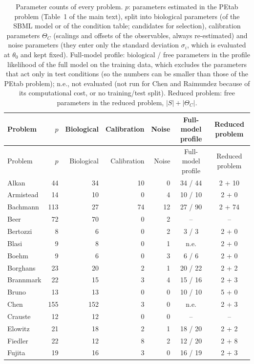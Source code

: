 \begin{longtable}{@{}lrrrrcc@{}}
\caption{Parameter counts of every problem. $p$: parameters estimated in the PEtab problem (Table~1 of the main text), split into biological parameters (of the SBML model or of the condition table; candidates for selection), calibration parameters $\Theta_C$ (scalings and offsets of the observables, always re-estimated) and noise parameters (they enter only the standard deviation $\sigma_i$, which is evaluated at $\theta_0$ and kept fixed). Full-model profile: biological / free parameters in the profile likelihood of the full model on the training data, which excludes the parameters that act only in test conditions (so the numbers can be smaller than those of the PEtab problem); n.e., not evaluated (not run for Chen and Raimundez because of its computational cost, or no training/test split). Reduced problem: free parameters in the reduced problem, $|S|+|\Theta_C|$.}\label{tab:counts}\\
\toprule
Problem & $p$ & Biological & Calibration & Noise & Full-model profile & Reduced problem \\
\midrule
\endfirsthead
\toprule
Problem & $p$ & Biological & Calibration & Noise & Full-model profile & Reduced problem \\
\midrule
\endhead
Alkan & 44 & 34 & 10 & 0 & 34 / 44 & 2 + 10 \\
Armistead & 14 & 10 & 0 & 4 & 10 / 10 & 2 + 0 \\
Bachmann & 113 & 27 & 74 & 12 & 27 / 90 & 2 + 74 \\
Beer & 72 & 70 & 0 & 2 & -- & -- \\
Bertozzi & 8 & 6 & 0 & 2 & 3 / 3 & 2 + 0 \\
Blasi & 9 & 8 & 0 & 1 & n.e. & 2 + 0 \\
Boehm & 9 & 6 & 0 & 3 & 6 / 6 & 2 + 0 \\
Borghans & 23 & 20 & 2 & 1 & 20 / 22 & 2 + 2 \\
Brannmark & 22 & 15 & 3 & 4 & 15 / 16 & 2 + 3 \\
Bruno & 13 & 13 & 0 & 0 & 10 / 10 & 5 + 0 \\
Chen & 155 & 152 & 3 & 0 & n.e. & 2 + 3 \\
Crauste & 12 & 12 & 0 & 0 & -- & -- \\
Elowitz & 21 & 18 & 2 & 1 & 18 / 20 & 2 + 2 \\
Fiedler & 22 & 12 & 8 & 2 & 12 / 20 & 2 + 8 \\
Fujita & 19 & 16 & 3 & 0 & 16 / 19 & 2 + 3 \\

\end{longtable}
